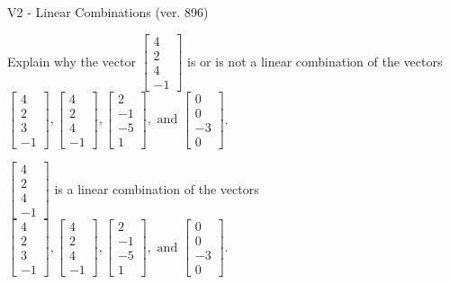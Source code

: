 \begin{exercise}
  \begin{exerciseTitle}V2 - Linear Combinations (ver. 896)\end{exerciseTitle}
  \begin{exerciseStatement}
    Explain why the vector \(\left[\begin{array}{c}
4 \\
2 \\
4 \\
-1
\end{array}\right]\)  is or is not a linear 
	combination of the vectors \(\left[\begin{array}{c}
4 \\
2 \\
3 \\
-1
\end{array}\right] , \left[\begin{array}{c}
4 \\
2 \\
4 \\
-1
\end{array}\right] , \left[\begin{array}{c}
2 \\
-1 \\
-5 \\
1
\end{array}\right] , \text{ and } \left[\begin{array}{c}
0 \\
0 \\
-3 \\
0
\end{array}\right]\).
	


  \end{exerciseStatement}
  \begin{exerciseAnswer}
   \(\left[\begin{array}{c}
4 \\
2 \\
4 \\
-1
\end{array}\right]\) 
  	 is  
	a linear combination of the vectors \(\left[\begin{array}{c}
4 \\
2 \\
3 \\
-1
\end{array}\right] , \left[\begin{array}{c}
4 \\
2 \\
4 \\
-1
\end{array}\right] , \left[\begin{array}{c}
2 \\
-1 \\
-5 \\
1
\end{array}\right] , \text{ and } \left[\begin{array}{c}
0 \\
0 \\
-3 \\
0
\end{array}\right]\).


\end{exerciseAnswer}
\end{exercise}

